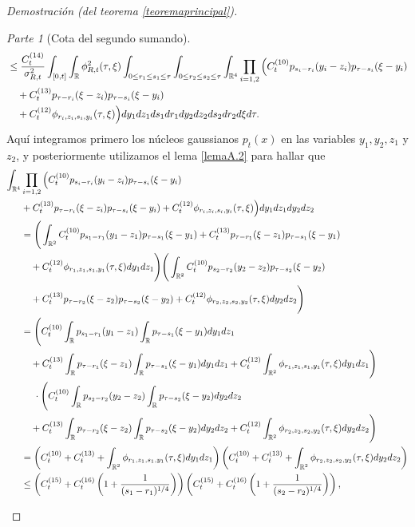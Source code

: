 \documentclass[letterpaper,twoside,12pt]{book}
\newcommand{\R}{\mathbb{R}}
\newcommand{\1}{\mathds{1}}
\theoremstyle{definition}
\theoremstyle{definition}
\theoremstyle{remark}
\newtheorem{proofpart}{Parte}
\theoremstyle{definition}
\theoremstyle{definition}
\theoremstyle{definition}
\theoremstyle{definition}
\theoremstyle{definition}
\begin{document}
\begin{proof}[Demostración (del teorema \ref{teoremaprincipal})]
\begin{proofpart}[Cota del segundo sumando]
\begin{align}
   &\leq \frac{C_t^{(14)}}{\sigma_{R,t}^2}\int_{[0,t]}\int_\R\phi_{R,t}^2(\tau,\xi)\int_{0\leq r_1\leq s_1\leq \tau}\int_{0\leq r_2\leq s_2\leq \tau}\int_{\R^4}\prod_{i=1,2}\Big(C^{(10)}_tp_{s_i-r_i}(y_i-z_i)p_{\tau-s_i}(\xi-y_i)\notag\\
   &\ \ \ +C_t^{(13)}p_{\tau-r_i}(\xi-z_i)p_{\tau-s_i}(\xi-y_i)\notag\\
   &\ \ \ +C_t^{(12)}\phi_{r_i,z_i,s_i,y_i}(\tau,\xi)\Big)  dy_1dz_1ds_1dr_1dy_2dz_2ds_2dr_2d\xi d\tau.\label{pruebacotaphi1}
\end{align}
Aquí integramos primero los núcleos gaussianos $p_t(x)$ en las variables $y_1,y_2,z_1$ y $z_2$, y posteriormente utilizamos el lema \ref{lemaA.2} para hallar que 
\begin{align}
   \int_{\R^{4}}&\prod_{i=1,2}\Big(C^{(10)}_tp_{s_i-r_i}(y_i-z_i)p_{\tau-s_i}(\xi-y_i)\notag\\
   &+C_t^{(13)}p_{\tau-r_i}(\xi-z_i)p_{\tau-s_i}(\xi-y_i)+C_t^{(12)}\phi_{r_i,z_i,s_i,y_i}(\tau,\xi)\Big)  dy_1dz_1dy_2dz_2\notag\\
   &=\Bigg(\int_{\R^{2}}C^{(10)}_tp_{s_1-r_1}(y_1-z_1)p_{\tau-s_1}(\xi-y_1)+C_t^{(13)}p_{\tau-r_1}(\xi-z_1)p_{\tau-s_1}(\xi-y_1)\notag\\
   &\ \ \ +C_t^{(12)}\phi_{r_1,z_1,s_1,y_1}(\tau,\xi)dy_1dz_1\Bigg) \Bigg(\int_{\R^{2}}C^{(10)}_tp_{s_2-r_2}(y_2-z_2)p_{\tau-s_2}(\xi-y_2)\notag\\
   &\ \ \ +C_t^{(13)}p_{\tau-r_2}(\xi-z_2)p_{\tau-s_2}(\xi-y_2)+C_t^{(12)}\phi_{r_2,z_2,s_2,y_2}(\tau,\xi)dy_2dz_2\Bigg)\notag\\
   &=\Bigg(C^{(10)}_t\int_{\R}p_{s_1-r_1}(y_1-z_1)\int_{\R}p_{\tau-s_1}(\xi-y_1)dy_1dz_1\notag\\
   &\ \ \ +C_t^{(13)}\int_{\R}p_{\tau-r_1}(\xi-z_1)\int_{\R}p_{\tau-s_1}(\xi-y_1)dy_1dz_1+C_t^{(12)}\int_{\R^2}\phi_{r_1,z_1,s_1,y_1}(\tau,\xi)dy_1dz_1\Bigg)\notag\\
   &\ \ \ \ \cdot\Bigg(C^{(10)}_t\int_{\R}p_{s_2-r_2}(y_2-z_2)\int_{\R}p_{\tau-s_2}(\xi-y_2)dy_2dz_2\notag\\
   &\ \ \ +C_t^{(13)}\int_{\R}p_{\tau-r_2}(\xi-z_2)\int_{\R}p_{\tau-s_2}(\xi-y_2)dy_2dz_2+C_t^{(12)}\int_{\R^2}\phi_{r_2,z_2,s_2,y_2}(\tau,\xi)dy_2dz_2\Bigg)\notag\\
   &=\left(C_t^{(10)}+C_t^{(13)}+\int_{\R^2}\phi_{r_1,z_1,s_1,y_1}(\tau,\xi)dy_1dz_1\right)\left(C_t^{(10)}+C_t^{(13)}+\int_{\R^2}\phi_{r_2,z_2,s_2,y_2}(\tau,\xi)dy_2dz_2\right)\notag\\
   &\leq\left(C_t^{(15)}+C_t^{(16)}\left(1+\frac{1}{(s_1-r_1)^{1/4}}\right)\right)\left(C_t^{(15)}+C_t^{(16)}\left(1+\frac{1}{(s_2-r_2)^{1/4}}\right)\right),\label{pruebacotaphi2}                      

\end{align}
\end{proofpart}
\end{proof}
\end{document}
